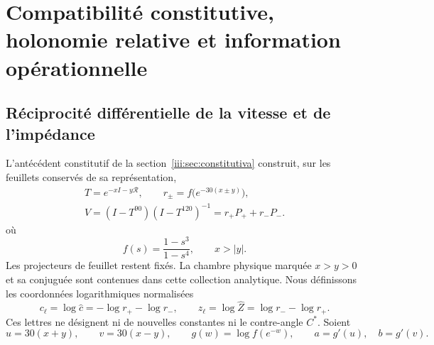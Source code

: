 \section{Compatibilité constitutive, holonomie relative et information opérationnelle}
\label{md:comp:capitulo}

\subsection{Réciprocité différentielle de la vitesse et de l’impédance}
\label{md:comp:reciprocidad}

L’antécédent constitutif de la section~\ref{iii:sec:constitutiva} construit, sur les feuillets
conservés de sa représentation,
\begin{equation}
 \begin{gathered}
 T=e^{-xI-y\mathcal R},\qquad
 r_\pm=f\bigl(e^{-30(x\pm y)}\bigr),\\
 V=(I-T^{90})(I-T^{120})^{-1}=r_+P_++r_-P_-.
 \end{gathered}
 \label{md:comp:constitutiva}
\end{equation}
où
\[
 f(s)=\frac{1-s^3}{1-s^4},\qquad x>|y|.
\]
Les projecteurs de feuillet restent fixés. La chambre physique marquée
\(x>y>0\) et sa conjuguée sont contenues dans cette collection analytique.
Nous définissons les coordonnées logarithmiques normalisées
\begin{equation}
 c_\ell=\log\widehat c=-\log r_+-\log r_-,\qquad
 z_\ell=\log\widehat Z=\log r_--\log r_+.
 \label{md:comp:logaritmos}
\end{equation}
Ces lettres ne désignent ni de nouvelles constantes ni le contre-angle \(C^*\).
Soient
\[
 u=30(x+y),\qquad v=30(x-y),\qquad
 g(w)=\log f(e^{-w}),\qquad a=g'(u),\quad b=g'(v).
\]

